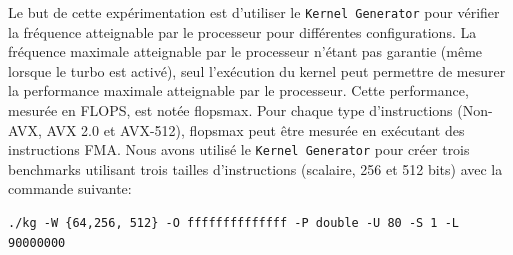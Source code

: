     
    Le but de cette expérimentation est d'utiliser le \verb|Kernel Generator| pour vérifier la fréquence atteignable par le processeur pour différentes configurations. La fréquence maximale atteignable par le processeur n'étant pas garantie (même lorsque le turbo est activé), seul l'exécution du kernel peut permettre de mesurer la performance maximale atteignable par le processeur. Cette performance, mesurée en \gls{FLOPS}, est notée \gls{flopsmax}. Pour chaque type d'instructions (Non-AVX, AVX 2.0 et AVX-512), \gls{flopsmax} peut être mesurée en exécutant des instructions \gls{FMA}. Nous avons utilisé le \verb|Kernel Generator| pour créer trois benchmarks utilisant trois tailles d'instructions (scalaire, 256 et 512 bits) avec la commande suivante:\\
\begin{minipage}{0.97\linewidth}         \begin{lstlisting}
./kg -W {64,256, 512} -O ffffffffffffff -P double -U 80 -S 1 -L 90000000
\end{lstlisting} \end{minipage}\\


    
    

